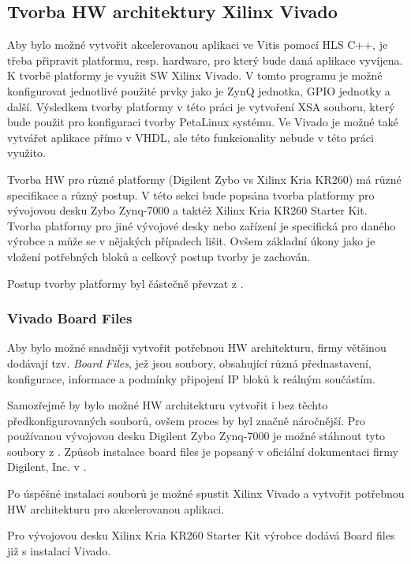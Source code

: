 \documentclass[a4paper, twoside, 11pt]{article}
\begin{document}
	\subsection{Tvorba HW architektury Xilinx Vivado}
		Aby bylo možné vytvořit akcelerovanou aplikaci ve Vitis pomocí HLS C++, je třeba připravit platformu, resp. hardware, pro který bude daná aplikace vyvíjena. K tvorbě platformy je využit SW Xilinx Vivado. V tomto programu je možné konfigurovat jednotlivé použité prvky jako je ZynQ jednotka, GPIO jednotky a další. Výsledkem tvorby platformy v této práci je vytvoření XSA souboru, který bude použit pro konfiguraci tvorby PetaLinux systému. Ve Vivado je možné také vytvářet aplikace přímo v VHDL, ale této funkcionality nebude v této práci využito.\par
		Tvorba HW pro různé platformy (Digilent Zybo vs Xilinx Kria KR260) má různé specifikace a různý postup.
		V této sekci bude popsána tvorba platformy pro vývojovou desku Zybo Zynq-7000 a taktéž Xilinx Kria KR260 Starter Kit. Tvorba platformy pro jiné vývojové desky nebo zařízení je specifická pro daného výrobce a může se v nějakých případech lišit. Ovšem základní úkony jako je vložení potřebných bloků a celkový postup tvorby je zachován.\par
		Postup tvorby platformy byl částečně převzat z \cite{hackster-vitis-2021-1-embedded-platform-for-zybo-z7-20}.

		\subsubsection{Vivado Board Files}\label{subsubsec:vivado-board-files}
			Aby bylo možné snadněji vytvořit potřebnou HW architekturu, firmy většinou dodávají tzv. \textit{Board Files}, jež jsou soubory, obsahující různá přednastavení, konfigurace, informace a podmínky připojení IP bloků k reálným součástím. \cite{github-vivado-board-files-for-digilent-fpga-boards}\par
			Samozřejmě by bylo možné HW architekturu vytvořit i bez těchto předkonfigurovaných souborů, ovšem proces by byl značně náročnější. Pro používanou vývojovou desku Digilent Zybo Zynq-7000 je možné stáhnout tyto soubory z \cite{github-vivado-board-files-for-digilent-fpga-boards}. Způsob instalace board files je popsaný v oficiální dokumentaci firmy Digilent, Inc. v \cite{digilent-installing-vivado-vitis-and-digilent-board-files}.\par
			Po úspěšné instalaci souborů je možné spustit Xilinx Vivado a vytvořit potřebnou HW architekturu pro akcelerovanou aplikaci.\par
			Pro vývojovou desku Xilinx Kria KR260 Starter Kit výrobce dodává Board files již s instalací Vivado.
		
\end{document}
